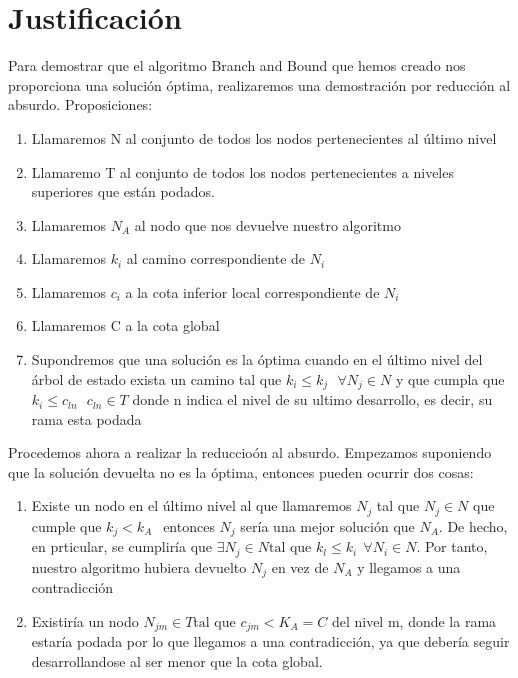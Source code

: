 \documentclass[11pt,openany]{book}
\begin{document}
\section{Justificación}

Para demostrar que el algoritmo Branch and Bound que hemos creado nos proporciona una solución óptima, realizaremos una
demostración por reducción al absurdo. Proposiciones:
\begin{enumerate}
      \item Llamaremos N al conjunto de todos los nodos pertenecientes al último nivel
      \item Llamaremo T al conjunto de todos los nodos pertenecientes a niveles superiores que están podados.
      \item Llamaremos $N_A$ al nodo que nos devuelve nuestro algoritmo
      \item Llamaremos $k_i$ al camino correspondiente de $N_i$
      \item Llamaremos $c_i$ a la cota inferior local correspondiente de $N_i$
      \item Llamaremos C a la cota global
      \item Supondremos que una solución es la óptima cuando en el último nivel del árbol de estado exista
      un camino tal que $k_i \leq k_j \ \ \ \forall N_j \in N$ y que cumpla que $k_i \leq c_{ln}  \ \ \ c_{ln} \in T $ donde 
      n indica el nivel de su ultimo desarrollo, es decir, su rama esta podada 
\end{enumerate}

Procedemos ahora a realizar la reduccioón al absurdo.
Empezamos suponiendo que la solución devuelta no es la óptima, entonces pueden ocurrir dos cosas:
\begin{enumerate}
    \item Existe un nodo en el último nivel al que llamaremos $N_j$ tal que $ N_j \in N$ que cumple que
     $k_j < k_A  \ \ $  entonces  $ N_j$  sería una mejor solución que $N_A$. De hecho, en prticular, se cumpliría que
     $ \exists N_j \in N \text{tal que } k_l \leq k_i  \ \ \forall N_i \in N $. Por tanto, nuestro algoritmo hubiera 
     devuelto $N_j$ en vez de $N_A$ y llegamos a una contradicción
    \item Existiría un nodo $N_{jm} \in T \text{tal que } c_{jm} < K_A = C$ del nivel m, donde la rama estaría podada
    por lo que llegamos a una contradicción, ya que debería seguir desarrollandose al ser menor que la cota global. 
\end{enumerate}
\end{document}
